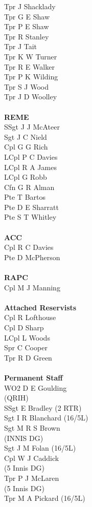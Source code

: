\begin{multicols}{4}
  Tpr J Shacklady \\
  Tpr G E Shaw \\
  Tpr P E Shaw \\
  Tpr R Stanley \\
  Tpr J Tait \\
  Tpr K W Turner \\
  Tpr R E Walker \\
  Tpr P K Wilding \\
  Tpr S J Wood \\
  Tpr J D Woolley \\
  \\
  \textbf{REME} \\
  SSgt J J McAteer \\
  Sgt J C Nield \\
  Cpl G G Rich \\
  LCpl P C Davies \\
  LCpl R A James \\
  LCpl G Robb \\
  Cfn G R Alman \\
  Pte T Bartos \\
  Pte D E Sharratt \\
  Pte S T Whitley \\
  \\
  \textbf{ACC} \\
  Cpl R C Davies \\
  Pte D McPherson \\
  \\
  \textbf{RAPC} \\
  Cpl M J Manning \\
  \\
  \textbf{Attached Reservists} \\
  Cpl R Lofthouse \\
  Cpl D Sharp \\
  LCpl L Woods \\
  Spr C Cooper \\
  Tpr R D Green \\
  \\
  \textbf{Permanent Staff} \\
  WO2 D E Goulding \\ \indent (QRIH) \\
  SSgt E Bradley (2 RTR) \\
  Sgt I R Blanchard (16/5L) \\
  Sgt M R S Brown \\ \indent (INNIS DG) \\
  Sgt J M Folan (16/5L) \\
  Cpl W J Caddick \\ \indent (5 Innis DG) \\
  Tpr P J McLaren \\ \indent (5 Innis DG) \\
  Tpr M A Pickard (16/5L)
\end{multicols}

\pagebreak
